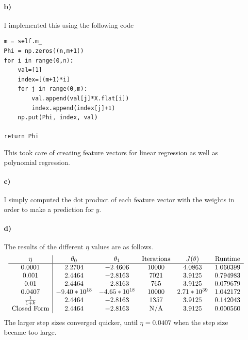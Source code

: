 \documentclass[12pt]{article}
\begin{document}
\paragraph{b)}

I implemented this using the following code

\begin{verbatim}
m = self.m_
Phi = np.zeros((n,m+1))
for i in range(0,n):
    val=[1]
    index=[(m+1)*i]
    for j in range(0,m):
        val.append(val[j]*X.flat[i])
        index.append(index[j]+1)
    np.put(Phi, index, val)

return Phi
\end{verbatim}
This took care of creating feature vectors for linear regression as well as polynomial regression.

\paragraph{c)}

I simply computed the dot product of each feature vector with the weights in order to make a prediction for \(y\).

\paragraph{d)}

The results of the different \(\eta\) values are as follows.
\[
        \begin{array}{c | c c c c c}
                \eta & \theta_0 & \theta_1 & \text{Iterations} & J(\theta) & \text{Runtime}\\
                \hline
                0.0001 & 2.2704 & -2.4606 & 10000 & 4.0863 & 1.060399\\
                0.001 & 2.4464 & -2.8163 & 7021 & 3.9125 & 0.794983\\
                0.01 & 2.4464 & -2.8163 & 765 & 3.9125 & 0.079679\\
                0.0407 & -9.40*10^{18}& -4.65*10^{18} & 10000 & 2.71*10^{39} & 1.042172\\
                \frac{1}{1+k} & 2.4464 & -2.8163 & 1357 & 3.9125 & 0.142043\\
                \text{Closed Form} & 2.4464 & -2.8163 & \text{N/A} & 3.9125 & 0.000560\\
        \end{array}
\]
The larger step sizes converged quicker, until \(\eta=0.0407\) when the step size became too large.
\end{document}
